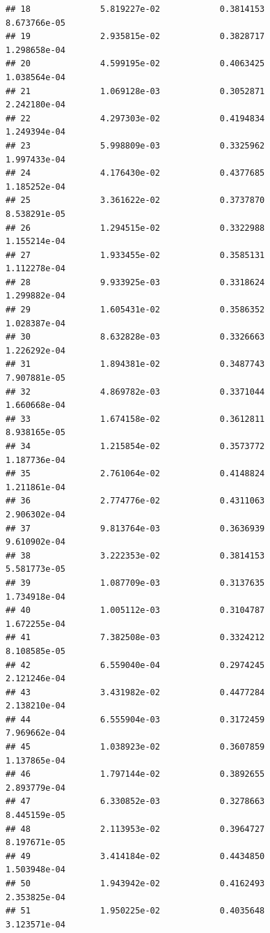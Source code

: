 \documentclass[
]{article}
\begin{document}
\begin{verbatim}
## 18              5.819227e-02            0.3814153            8.673766e-05
## 19              2.935815e-02            0.3828717            1.298658e-04
## 20              4.599195e-02            0.4063425            1.038564e-04
## 21              1.069128e-03            0.3052871            2.242180e-04
## 22              4.297303e-02            0.4194834            1.249394e-04
## 23              5.998809e-03            0.3325962            1.997433e-04
## 24              4.176430e-02            0.4377685            1.185252e-04
## 25              3.361622e-02            0.3737870            8.538291e-05
## 26              1.294515e-02            0.3322988            1.155214e-04
## 27              1.933455e-02            0.3585131            1.112278e-04
## 28              9.933925e-03            0.3318624            1.299882e-04
## 29              1.605431e-02            0.3586352            1.028387e-04
## 30              8.632828e-03            0.3326663            1.226292e-04
## 31              1.894381e-02            0.3487743            7.907881e-05
## 32              4.869782e-03            0.3371044            1.660668e-04
## 33              1.674158e-02            0.3612811            8.938165e-05
## 34              1.215854e-02            0.3573772            1.187736e-04
## 35              2.761064e-02            0.4148824            1.211861e-04
## 36              2.774776e-02            0.4311063            2.906302e-04
## 37              9.813764e-03            0.3636939            9.610902e-04
## 38              3.222353e-02            0.3814153            5.581773e-05
## 39              1.087709e-03            0.3137635            1.734918e-04
## 40              1.005112e-03            0.3104787            1.672255e-04
## 41              7.382508e-03            0.3324212            8.108585e-05
## 42              6.559040e-04            0.2974245            2.121246e-04
## 43              3.431982e-02            0.4477284            2.138210e-04
## 44              6.555904e-03            0.3172459            7.969662e-04
## 45              1.038923e-02            0.3607859            1.137865e-04
## 46              1.797144e-02            0.3892655            2.893779e-04
## 47              6.330852e-03            0.3278663            8.445159e-05
## 48              2.113953e-02            0.3964727            8.197671e-05
## 49              3.414184e-02            0.4434850            1.503948e-04
## 50              1.943942e-02            0.4162493            2.353825e-04
## 51              1.950225e-02            0.4035648            3.123571e-04

\end{verbatim}
\end{document}
